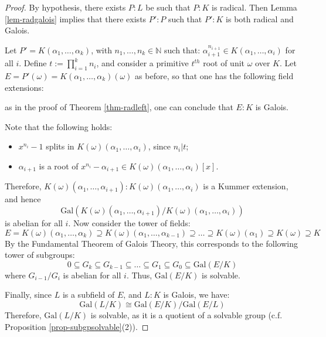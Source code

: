 \documentclass[11pt]{book}
\begin{document}
\begin{proof}
By hypothesis, there exists $P:L$ be such that $P:K$ is radical. Then Lemma \ref{lem-radgalois} implies that there exists $P':P$ such that $P':K$ is both radical and Galois.

Let $P' = K(\alpha_1, \dots, \alpha_k) $, with $ n_1, \dots, n_k \in \mathbb{N} $ such that:
$
\alpha_{i+1}^{n_{i+1}} \in K(\alpha_1, \dots, \alpha_i)
$ for all $i$. 
Define $ t := \prod_{i=1}^k n_i $, and consider a primitive $t^{th}$ root of unit $\omega$ over $K$. Let $E = P'(\omega) = K(\alpha_1, \dots, \alpha_k)(\omega)$ as before, so that one has the following field extensions:
\begin{center}
\end{center}
as in the proof of Theorem \ref{thm-radleft}, one can conclude that $E:K$ is Galois.

\smallskip
Note that the following holds:
\begin{itemize}
    \item $ x^{n_i} - 1 $ splits in $ K(\omega)(\alpha_1, \dots, \alpha_i)$, since $n_i | t$;
    \item $ \alpha_{i+1} $ is a root of $ x^{n_i} - \alpha_{i+1} \in K(\omega)(\alpha_1, \dots, \alpha_i)[x]$.
\end{itemize}
Therefore,  $
K(\omega)(\alpha_1, \dots, \alpha_{i+1}):K(\omega)(\alpha_1, \dots, \alpha_i) 
$
is a Kummer extension, and hence
$$
\text{Gal}\left(K(\omega)(\alpha_1, \dots, \alpha_{i+1}) / K(\omega)(\alpha_1, \dots, \alpha_i)\right)
$$
is abelian for all $i$. Now consider the tower of fields:
$$
E = K(\omega)(\alpha_1, \dots, \alpha_k) \supseteq K(\omega)(\alpha_1, \dots, \alpha_{k-1}) \supseteq \dots \supseteq K(\omega)(\alpha_1) \supseteq K(\omega) \supseteq K
$$
By the Fundamental Theorem of Galois Theory, this corresponds to the following tower of subgroups:
$$
0 \subseteq G_k \subseteq G_{k-1} \subseteq \dots \subseteq G_1 \subseteq G_0 \subseteq \text{Gal}(E/K)
$$
where $ G_{i-1}/G_i $ is abelian for all $ i $.
Thus, $ \text{Gal}(E/K) $ is solvable. 

Finally, since $ L $ is a subfield of $ E $, and $L:K$ is Galois, we have:
$$
\text{Gal}(L/K) \cong \text{Gal}(E/K) / \text{Gal}(E/L)
$$
Therefore, $ \text{Gal}(L/K) $ is solvable, as it is a quotient of a solvable group (c.f. Proposition \ref{prop-subgpsolvable}(2)). 
\end{proof}
\end{document}
